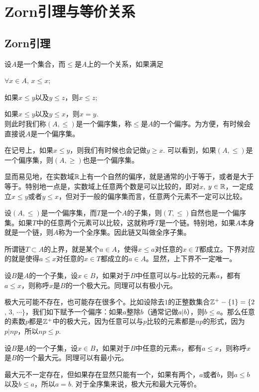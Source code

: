 \appendix
\renewcommand{\thepara}{\Alph{chapter}.\arabic{para}}

\chapter{Zorn引理与等价关系}

\section{Zorn引理}
\para 设$A$是一个集合，而$\leq$是$A$上的一个关系，如果满足

 $\forall x\in A$, $x\leq x$;

 如果$x\leq y$以及$y\leq z$，则$x\leq z$;

 如果$x\leq y$以及$y \leq x$，则$x=y$.\\则此时我们称$(A,\leq)$是一个偏序集，称$\leq$是$A$的一个偏序。为方便，有时候会直接说$A$是一个偏序集。

在记号上，如果$x\leq y$，则我们有时候也会记做$y\geq x$. 可以看到，如果$(A,\leq)$是一个偏序集，则$(A,\geq)$也是一个偏序集。

显而易见地，在实数域$\mathbb{R}$上有一个自然的偏序，就是通常的小于等于，或者是大于等于。特别地一点是，实数域上任意两个数是可以比较的，即对$x$, $y\in \mathbb{R}$，一定成立$x\leq y$或者$y\leq x$，但对于一般的偏序集而言，任意两个元素不一定可以比较。

\para 设$(A,\leq)$是一个偏序集，而$T$是一个$A$的子集，则$(T,\leq)$自然也是一个偏序集。如果$T$中的任意两个元素可以比较，这就称呼$T$是一个链。特别地，如果$A$本身就是一个链，则$A$称为一个全序集。因此链又叫做全序子集。

\para 所谓链$T\subset A$的上界，就是某个$a\in A$，使得$x\leq a$对任意的$x\in T$都成立。下界对应的就是使得$a\leq x$对任意的$x\in T$都成立的$a\in A$。显然，上下界不一定唯一。

\para 设$B$是$A$的一个子集，设$x\in B$，如果对于$B$中任意可以与$x$比较的元素$a$，都有$a\leq x$，则称呼$x$是$B$的一个极大元。同理可以有极小元。

极大元可能不存在，也可能存在很多个。比如设除去$1$的正整数集合$\mathbb{Z}^+-\{1\}=\{2$, $3$, $\cdots\}$，我们如下赋予一个偏序：如果$a$整除$b$（通常记做$a|b$），则$b\leq a$。那么任意的素数$p$都是$\mathbb{Z}^+$中的极大元，因为任意可以与$p$比较的元素都是$np$的形式，因为$p|np$，所以$np\leq p$.

\para 设$B$是$A$的一个子集，设$x\in B$，如果对于$B$中任意的元素$a$，都有$a\leq x$，则称呼$x$是$B$的一个最大元。同理可以有最小元。

最大元不一定存在，但如果存在显然只能有一个，如果有两个，$a$或者$b$，则$a\leq b$以及$b\leq a$，所以$a=b$. 对于全序集来说，极大元和最大元等价。


